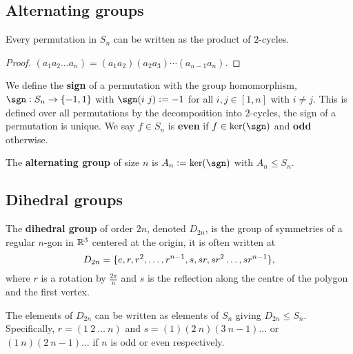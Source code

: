 \documentclass[../Year1.tex]{subfiles}
\begin{document}
\subsection{Alternating groups}

\begin{theorem}
    Every permutation in $S_n$ can be written as the product of $2$-cycles.
\end{theorem}

\begin{proof}
    $(a_1a_2\ldots a_n) = (a_1a_2)(a_2a_3)\cdots(a_{n-1}a_n)$.
\end{proof}

\begin{definition}
    We define the \textbf{sign} of a permutation with the group homomorphism, $\sgn:S_n\rightarrow\{-1,1\}$ with $\sgn(i \ j) := -1$ for all $i,j\in[1,n]$ with $i\neq j$. This is defined over all permutations by the decomposition into $2$-cycles, the sign of a permutation is unique. We say $f\in S_n$ is \textbf{even} if $f\in\ker(\sgn)$ and \textbf{odd} otherwise.
\end{definition}

\begin{definition}
    The \textbf{alternating group} of size $n$ is $A_n := \ker(\sgn)$ with $A_n\leq S_n$.
\end{definition}

\subsection{Dihedral groups}

\begin{definition}
    The \textbf{dihedral group} of order $2n$, denoted $D_{2n}$, is the group of symmetries of a regular $n$-gon in $\mathbb{R}^3$ centered at the origin, it is often written at \[
        D_{2n} = \{e,r,r^2,\ldots,r^{n-1},s,sr,sr^2\ldots,sr^{n-1}\}
    \textcolor{black}{,}
    \] where $r$ is a rotation by $\frac{2\pi}{n}$ and $s$ is the reflection along the centre of the polygon and the first vertex.
\end{definition}

\begin{theorem}
    The elements of $D_{2n}$ can be written as elements of $S_n$ giving $D_{2n}\leq S_n$. Specifically, $r = (1 \ 2 \ \ldots \ n)$ and $s = (1)(2 \ n)(3 \ n-1)\ldots$ or $(1 \ n)(2 \ n-1)\ldots$ if $n$ is odd or even respectively.
\end{theorem}
\end{document}
